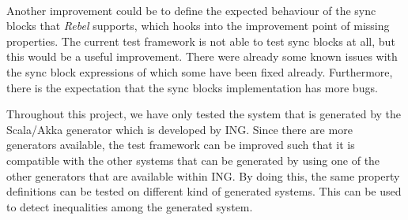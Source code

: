 \\
Another improvement could be to define the expected behaviour of the sync blocks that \textit{Rebel} supports, which hooks into the improvement point of missing properties. The current test framework is not able to test sync blocks at all, but this would be a useful improvement. There were already some known issues with the sync block expressions of which some have been fixed already. Furthermore, there is the expectation that the sync blocks implementation has more bugs.


Throughout this project, we have only tested the system that is generated by the Scala/Akka generator which is developed by ING. Since there are more generators available, the test framework can be improved such that it is compatible with the other systems that can be generated by using one of the other generators that are available within ING. By doing this, the same property definitions can be tested on different kind of generated systems. This can be used to detect inequalities among the generated system.

